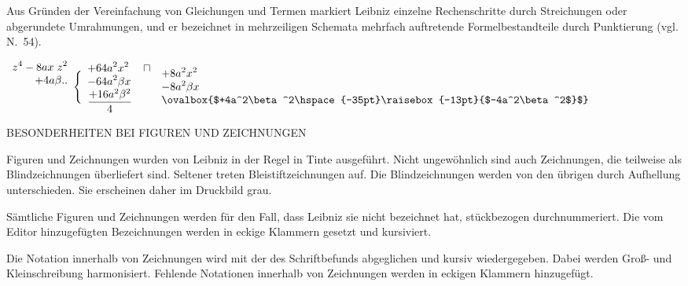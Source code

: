 Aus Gr\"{u}nden der Vereinfachung von Gleichungen und Termen markiert Leibniz einzelne Rechenschritte durch Streichungen oder abgerundete Umrahmungen, und er bezeichnet in mehrzeiligen Schemata mehrfach auftretende Formelbestandteile durch Punktierung (vgl. N.~54).
\begin{center}
   $\begin{array}{r}\displaystyle z^4- 8ax\hspace{3pt}z^2\\+4a\beta ..\\\rule[0cm]{0cm}{20pt}
                               \end{array}
                               \Bigg\{\begin{array}{ll}\displaystyle+64a^2x^2&\sqcap\\\displaystyle-64a^2\beta x&\\\displaystyle \frac{+16a^2\beta^2}{4}&\end{array}
                     \begin{array}{ll}\displaystyle+8a^2x^2&\\\displaystyle-8a^2\beta x&\\\displaystyle \ovalbox{$+4a^2\beta^2\hspace{-35pt}\raisebox{-13pt}{$-4a^2\beta^2$}$}&\end{array}$
\end{center}
\newpage
\par
\par\vspace{5.0ex}
\noindent\uppercase{Besonderheiten bei Figuren und Zeichnungen}\par\vspace{1.0ex}
\noindent
Figuren und Zeichnungen wurden von Leibniz in der Regel in Tinte aus\-gef\"{u}hrt. Nicht ungew\"{o}hnlich sind auch Zeichnungen, die teilweise als Blind\-zeichnungen \"{u}berliefert sind. Seltener treten Bleistiftzeichnungen auf. Die Blind\-zeichnungen werden von den \"{u}brigen durch Aufhellung unterschieden. Sie erscheinen daher im Druckbild grau.\par
S\"{a}mtliche Figuren und Zeichnungen werden f\"{u}r den Fall, dass Leibniz sie nicht bezeichnet hat, st\"{u}ckbezogen durchnummeriert. Die vom Editor hinzugef\"{u}gten Bezeichnungen werden in eckige Klammern gesetzt und kursiviert.\par
Die Notation innerhalb von Zeichnungen wird mit der des Schriftbefunds abgeglichen und kursiv wiedergegeben. Dabei werden Gro{\ss}- und Kleinschreibung harmonisiert. Fehlende Notationen innerhalb von Zeichnungen werden in eckigen Klammern hinzugef\"{u}gt. \par
